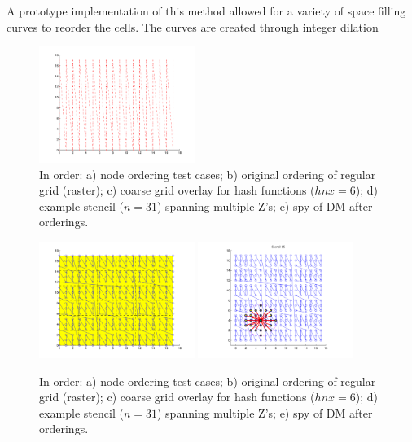 \documentclass{report}
\begin{document}
A prototype implementation of this method allowed for a variety of space filling curves to reorder the cells. The curves are created through integer dilation \cite{IntegerD} 


\begin{figure}
\centering
\includegraphics[width=0.45\textwidth]{rbffd_methods_content/hashing/originalorder_regulargrid-eps-converted-to.pdf}
\caption{In order: a) node ordering test cases; b) original ordering of regular grid (raster); c) coarse grid overlay for hash functions ($hnx = 6$); d) example stencil ($n=31$) spanning multiple Z's; e) spy of DM after orderings. }
\label{fig:orderings}
\end{figure}

\begin{figure}
\centering
\includegraphics[width=0.45\textwidth]{rbffd_methods_content/hashing/overlay_regulargrid-eps-converted-to.pdf} \includegraphics[width=0.45\textwidth]{rbffd_methods_content/hashing/stencil_regulargrid-eps-converted-to.pdf}
\caption{In order: a) node ordering test cases; b) original ordering of regular grid (raster); c) coarse grid overlay for hash functions ($hnx = 6$); d) example stencil ($n=31$) spanning multiple Z's; e) spy of DM after orderings. }
\label{fig:orderings}
\end{figure}
\end{document}
